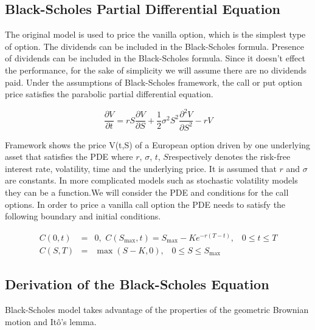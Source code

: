 \documentclass[12pt, oneside]{book}
\theoremstyle{plain}
\theoremstyle{definition}
\begin{document}
\subsection{Black-Scholes Partial Differential Equation}
The original model is used to price the vanilla  option, which is the simplest type of option. The dividends can be included in the Black-Scholes formula. Presence of dividends can be included in the Black-Scholes formula. Since it doesn't effect the performance, for the sake of simplicity we will assume there are no dividends paid. Under the assumptions of Black-Scholes framework, the call or put option price satisfies the parabolic partial differential equation.

\begin{equation}
\frac{\partial V}{\partial t} = rS\frac{\partial V}{\partial S}+\frac{1}{2} \sigma^2 S^2 \frac{\partial^2 V}{\partial S^2} - rV
\end{equation}

Framework shows the  price V(t,S)  of  a  European  option  driven  by  one underlying asset that satisfies the PDE where $r$, $\sigma$, $t$, $S$respectively denotes the risk-free interest rate, volatility, time and the underlying price.  It is assumed that $r$ and $\sigma$ are constants. In more complicated models such as stochastic volatility models they can be a function.We will consider the  PDE and conditions for the call options.  In order to price a vanilla call option the PDE needs to satisfy the following boundary and initial conditions. 

\begin{eqnarray}
C(0,t) &=& 0, \hspace{4pt} C(S_{\max},t)=S_{\max} - K e^{-r(T-t)}, \hspace{10pt} 0 \leq t \leq T \\[10pt]
C(S,T) &=& \max(S-K,0), \hspace{10pt} 0 \leq S \leq S_{\max}
\end{eqnarray}

\subsection{Derivation of the Black-Scholes Equation}
Black-Scholes model takes advantage of the properties of the geometric Brownian motion and It\^{o}'s lemma. 
\end{document}

